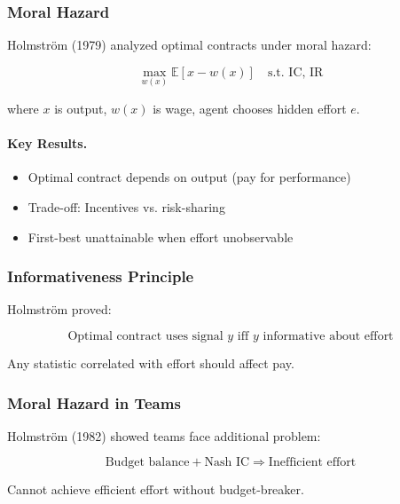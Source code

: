 \subsubsection{Moral Hazard}

Holmström (1979) analyzed optimal contracts under moral hazard:

\begin{equation}
\boxed{
\max_{w(x)} \mathbb{E}[x - w(x)] \quad \text{s.t. IC, IR}
}
\label{eq:moral-hazard}
\end{equation}

where $x$ is output, $w(x)$ is wage, agent chooses hidden effort $e$.

\paragraph{Key Results.}
\begin{itemize}
    \item Optimal contract depends on output (pay for performance)
    \item Trade-off: Incentives vs. risk-sharing
    \item First-best unattainable when effort unobservable
\end{itemize}

\subsubsection{Informativeness Principle}

Holmström proved:

\begin{equation}
\boxed{
\text{Optimal contract uses signal } y \text{ iff } y \text{ informative about effort}
}
\label{eq:informativeness}
\end{equation}

Any statistic correlated with effort should affect pay.

\subsubsection{Moral Hazard in Teams}

Holmström (1982) showed teams face additional problem:

\begin{equation}
\text{Budget balance} + \text{Nash IC} \Rightarrow \text{Inefficient effort}
\end{equation}

Cannot achieve efficient effort without budget-breaker.

